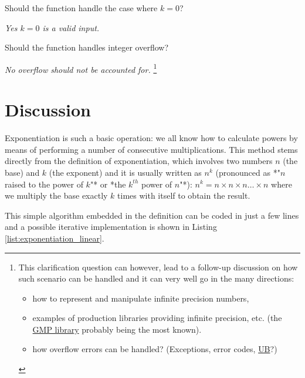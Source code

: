\begin{QandA}
    \item Should the function handle the case where $k=0$?
    \begin{answered}
        \textit{Yes $k=0$ is a valid input.}
    \end{answered}
    
    \item Should the function handles integer overflow?
    \begin{answered}
        \textit{No overflow should not be accounted for. }\footnote{
            This clarification question can however, lead to a follow-up discussion on how such scenario can be handled and it can very well go in the many directions: 
            \begin{itemize}
                \item how to represent and manipulate infinite precision numbers,
                \item examples of production libraries providing infinite precision, etc. (the \href{https://gmplib.org/}{GMP library}\cite{cit::web::gmplibrary} probably being the most known).
                \item how overflow errors can be handled? (Exceptions, error codes, \href{https://en.cppreference.com/w/cpp/language/ub}{UB}\cite{cit::std::ub}?)
            \end{itemize}
            }
    \end{answered}
        
\end{QandA}

\section{Discussion}
\label{exponentiation:sec:discussion}

Exponentiation is such a basic operation: we all know how to calculate powers by means of performing a number of consecutive multiplications. 
This method stems  directly from the definition of exponentiation, which involves two numbers $n$ (the base) and $k$ (the exponent) and it is usually written as $n^k$ (pronounced as *"$n$ raised to the power of $k$"* or *the ${k^{th}}$ power of $n$"*):
$n^k = n \times n \times n \ldots  \times n$ where we multiply the base exactly $k$ times with itself
to obtain the result. 

This simple algorithm embedded in the definition can be coded in just a few lines and a possible iterative implementation is shown in Listing
\ref{list:exponentiation_linear}.


